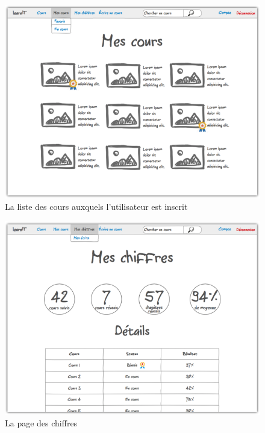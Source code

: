 \begin{figure}[!h]
    \centering
    \includegraphics[scale=1]{textures/images/annexes/maquettes/3-MesCours.png}
    \caption{La liste des cours auxquels l'utilisateur est inscrit}
\end{figure}
\begin{figure}[!h]
    \centering
    \includegraphics[scale=1]{textures/images/annexes/maquettes/4-MesChiffres(Cours).png}
    \caption{La page des chiffres}
\end{figure}

\newpage

